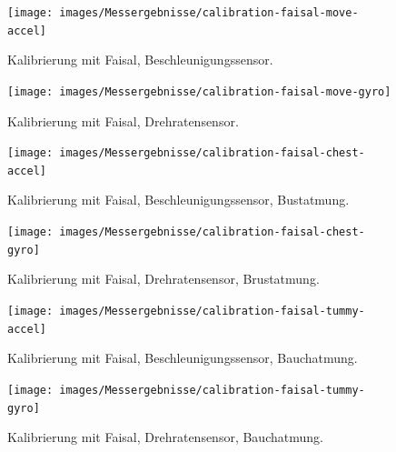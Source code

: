 \begin{figure}
	\centering
	\texttt{[image: images/Messergebnisse/calibration-faisal-move-accel]}
	\caption{Kalibrierung mit Faisal, Beschleunigungssensor.}
\end{figure}

\begin{figure}
	\centering
	\texttt{[image: images/Messergebnisse/calibration-faisal-move-gyro]}
	\caption{Kalibrierung mit Faisal, Drehratensensor.}
\end{figure}

\begin{figure}
	\centering
	\texttt{[image: images/Messergebnisse/calibration-faisal-chest-accel]}
	\caption{Kalibrierung mit Faisal, Beschleunigungssensor, Bustatmung.}
\end{figure}

\begin{figure}
	\centering
	\texttt{[image: images/Messergebnisse/calibration-faisal-chest-gyro]}
	\caption{Kalibrierung mit Faisal, Drehratensensor, Brustatmung.}
\end{figure}

\begin{figure}
	\centering
	\texttt{[image: images/Messergebnisse/calibration-faisal-tummy-accel]}
	\caption{Kalibrierung mit Faisal, Beschleunigungssensor, Bauchatmung.}
\end{figure}

\begin{figure}
	\centering
	\texttt{[image: images/Messergebnisse/calibration-faisal-tummy-gyro]}
	\caption{Kalibrierung mit Faisal, Drehratensensor, Bauchatmung.}
\end{figure}

